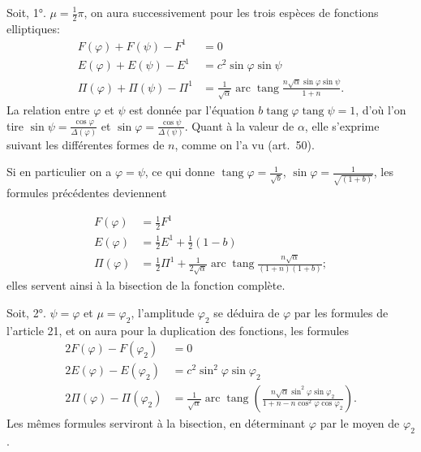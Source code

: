 \documentclass{article}
\begin{document}
Soit, 1°. $\mu=\frac{1}{2}\pi$, on aura successivement pour les trois espèces de fonctions elliptiques:
\[ \begin{aligned} F(\varphi)+F(\psi)-F^{1}&=0\\ E(\varphi)+E(\psi)-E^{1}&=c^{2}\sin\varphi\sin\psi\\ \Pi(\varphi)+\Pi(\psi)-\Pi^{1}&=\frac{1}{\sqrt{\alpha}}\operatorname{arc}\operatorname{tang}\frac{n\sqrt{\alpha}\sin\varphi\sin\psi}{1+n}. \end{aligned} \]
La relation entre $\varphi$ et $\psi$ est donnée par l'équation $b\operatorname{tang}\varphi\operatorname{tang}\psi=1$, d'où l'on tire $\sin\psi=\frac{\cos\varphi}{\Delta(\varphi)}$ et $\sin\varphi=\frac{\cos\psi}{\Delta(\psi)}$. Quant à la valeur de $\alpha$, elle s'exprime suivant les différentes formes de $n$, comme on l'a vu (art.\ 50).

Si en particulier on a $\varphi=\psi$, ce qui donne $\operatorname{tang}\varphi=\frac{1}{\sqrt{b}}$, $\sin\varphi=\frac{1}{\sqrt{(1+b)}}$, les formules précédentes deviennent

\[ \begin{aligned} F(\varphi)&=\tfrac{1}{2}F^{1}\\ E(\varphi)&=\tfrac{1}{2}E^{1}+\tfrac{1}{2}(1-b)\\ \Pi(\varphi)&=\tfrac{1}{2}\Pi^{1}+\frac{1}{2\sqrt{\alpha}}\operatorname{arc}\operatorname{tang}\frac{n\sqrt{\alpha}}{(1+n)(1+b)}; \end{aligned} \]
elles servent ainsi à la bisection de la fonction complète.

Soit, 2°. $\psi=\varphi$ et $\mu=\varphi_{2}$, l'amplitude $\varphi_{2}$ se déduira de $\varphi$ par les formules de l'article 21, et on aura pour la duplication des fonctions, les formules
\[ \begin{aligned} 2F(\varphi)-F(\varphi_{2})&=0\\ 2E(\varphi)-E(\varphi_{2})&=c^{2}\sin^{2}\varphi\sin\varphi_{2}\\ 2\Pi(\varphi)-\Pi(\varphi_{2})&=\frac{1}{\sqrt{\alpha}}\operatorname{arc}\operatorname{tang}\left(\frac{n\sqrt{\alpha}\sin^{2}\varphi\sin\varphi_{2}}{1+n-n\cos^{2}\varphi\cos\varphi_{2}}\right). \end{aligned} \]
Les mêmes formules serviront à la bisection, en déterminant $\varphi$ par le moyen de $\varphi_{2}$.
\end{document}
